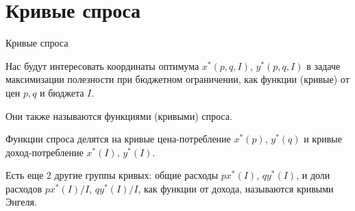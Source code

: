 \documentclass{beamer}
\begin{document}
\section{Кривые спроса}

\begin{frame}{Кривые спроса}

Нас будут интересовать координаты оптимума $x^{\ast}(p,q,I)$, $y^{\ast}(p,q,I)$ в задаче максимизации полезности при бюджетном ограничении, как функции (кривые) от цен $p,q$ и бюджета $I$. 

Они также называются \alert{функциями (кривыми) спроса}.

\begin{definition}
Функции спроса делятся на кривые \alert{цена-потребление} $x^{\ast}(p)$, $y^{\ast}(q)$ и кривые \alert{доход-потребление} $x^{\ast}(I)$, $y^{\ast}(I)$.
\end{definition}

Есть еще 2 другие группы кривых: общие расходы $p x^{\ast}(I)$, $q y^{\ast}(I)$, и доли расходов $p x^{\ast}(I)/I$, $q y^{\ast}(I)/I$, как функции от дохода, называются \alert{кривыми Энгеля}.

\end{frame}
\end{document}
